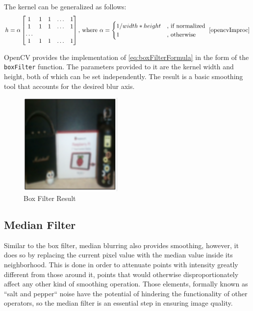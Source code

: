The kernel can be generalized as follows:
\begin{equation}
	\label{eq:boxFilterFormula}
	h = \alpha
	\begin{bmatrix}
		1 & 1 & 1 & \dots & 1 \\
		1 & 1 & 1 & \dots & 1 \\
		\dots                 \\
		1 & 1 & 1 & \dots & 1 \\
	\end{bmatrix}
	\text{, where }
	\alpha =
	\begin{cases}
		1 / width * height & \text{, if normalized} \\
		1                  & \text{, otherwise}     \\
	\end{cases}
	\text{ \cite{opencvImproc}}
\end{equation}

OpenCV provides the implementation of \cref{eq:boxFilterFormula} in the form of the \verb|boxFilter| function.
The parameters provided to it are the kernel width and height, both of which can be set independently. The
result is a basic smoothing tool that accounts for the desired blur axis.

\begin{figure}[H]
	\includegraphics[width=0.45\textwidth, height=0.45\textwidth]{resources/Box_2.png}
	\caption{Box Filter Result}
\end{figure}

\subsection{Median Filter}

Similar to the box filter, median blurring also provides smoothing, however, it does so by replacing the
current pixel value with the median value inside its neighborhood. This is done in order to attenuate points
with intensity greatly different from those around it, points that would otherwise disproportionately affect
any other kind of smoothing operation. Those elements, formally known as ``salt and pepper`` noise have the
potential of hindering the functionality of other operators, so the median filter is an essential step in
ensuring image quality. \cite{fipBerkley}

